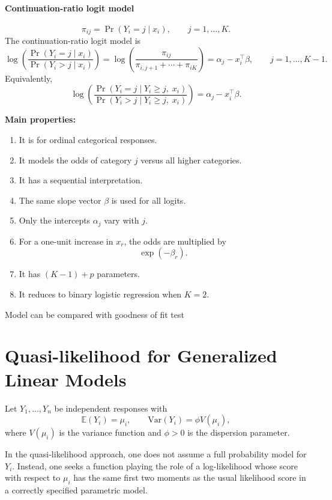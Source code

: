 \documentclass[11pt]{article}
\theoremstyle{definition}
\begin{document}
\paragraph{Continuation-ratio logit model}
\[
\pi_{ij}=\Pr(Y_i=j\mid x_i), \qquad j=1,\dots,K.
\]
The continuation-ratio logit model is
\[
\log\left(\frac{\Pr(Y_i=j\mid x_i)}{\Pr(Y_i>j\mid x_i)}\right)
=
\log\left(\frac{\pi_{ij}}{\pi_{i,j+1}+\cdots+\pi_{iK}}\right)
=
\alpha_j-x_i^\top\beta,
\qquad j=1,\dots,K-1.
\]
Equivalently,
\[
\log\left(
\frac{\Pr(Y_i=j\mid Y_i\ge j,\;x_i)}
{\Pr(Y_i>j\mid Y_i\ge j,\;x_i)}
\right)
=
\alpha_j-x_i^\top\beta.
\]

\textbf{Main properties:}
\begin{enumerate}
    \item It is for ordinal categorical responses.
    \item It models the odds of category \(j\) versus all higher categories.
    \item It has a sequential interpretation.
    \item The same slope vector \(\beta\) is used for all logits.
    \item Only the intercepts \(\alpha_j\) vary with \(j\).
    \item For a one-unit increase in \(x_r\), the odds are multiplied by
    \[
    \exp(-\beta_r).
    \]
    \item It has \((K-1)+p\) parameters.
    \item It reduces to binary logistic regression when \(K=2\).
\end{enumerate}
Model can be compared with goodness of fit test
\newpage
\section{Quasi-likelihood for Generalized Linear Models}

Let $Y_1,\dots,Y_n$ be independent responses with
\[
\mathbb{E}(Y_i)=\mu_i,\qquad \mathrm{Var}(Y_i)=\phi V(\mu_i),
\]
 where $V(\mu_i)$ is the variance function and $\phi>0$ is the dispersion parameter.

In the quasi-likelihood approach, one does not assume a full probability model for $Y_i$. Instead, one seeks a function playing the role of a log-likelihood whose score with respect to $\mu_i$ has the same first two moments as the usual likelihood score in a correctly specified parametric model.
\end{document}
